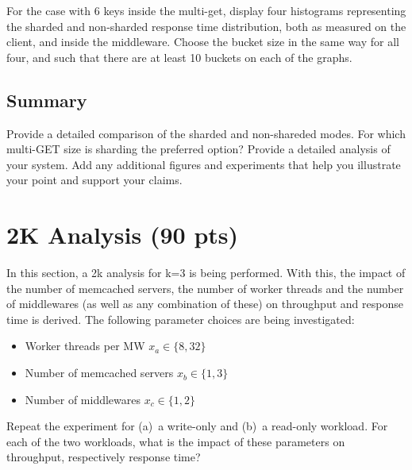 \documentclass[11pt,a4paper]{article}
\begin{document}
For the case with 6 keys inside the multi-get, display four histograms representing the sharded and non-sharded response time distribution, both as measured on the client, and inside the middleware. Choose the bucket size in the same way for all four, and such that there are at least 10 buckets on each of the graphs.

\subsection{Summary}

Provide a detailed comparison of the sharded and non-shareded modes. For which multi-GET size is sharding the preferred option? Provide a detailed analysis of your system. Add any additional figures and experiments that help you illustrate your point and support your claims.

\section{2K Analysis (90 pts)}

In this section, a 2k analysis for k=3 is being performed. With this, the impact of the number of memcached servers, the number of worker threads and the number of middlewares (as well as any combination of these) on throughput and response time is derived. The following parameter choices are being investigated:

\begin{itemize}
		
	\item Worker threads per MW $x_a \in \{8, 32\}$
	\item Number of memcached servers $x_b \in \{1, 3\}$
	\item Number of middlewares $x_c \in \{1,2\}$
	      	      
\end{itemize}

Repeat the experiment for (a)~a write-only and (b)~a read-only workload.
For each of the two workloads, what is the impact of these parameters on throughput, respectively response time?
\end{document}
